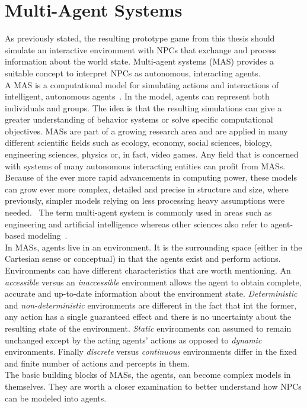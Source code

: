 \section{Multi-Agent Systems}
As previously stated, the resulting prototype game from this thesis should simulate an interactive environment with NPCs that exchange and process information about the world state. Multi-agent systems (MAS) provides a suitable concept to interpret NPCs as autonomous, interacting agents.\\
A MAS is a computational model for simulating actions and interactions of intelligent, autonomous agents~\cite{Wooldridge2009}. In the model, agents can represent both individuals and groups. The idea is that the resulting simulations can give a greater understanding of behavior systems or solve specific computational objectives. MASs are part of a growing research area and are applied in many different scientific fields such as ecology, economy, social sciences, biology, engineering sciences, physics or, in fact, video games. Any field that is concerned with systems of many autonomous interacting entities can profit from MASs. Because of the ever more rapid advancements in computing power, these models can grow ever more complex, detailed and precise in structure and size, where previously, simpler models relying on less processing heavy assumptions were needed.~\cite{Helbing2012} The term multi-agent system is commonly used in areas such as engineering  and artificial intelligence whereas other sciences also refer to agent-based modeling~\cite{Niazi2011}.\\
In MASs, agents live in an environment. It is the surrounding space (either in the Cartesian sense or conceptual) in that the agents exist and perform actions. Environments can have different characteristics that are worth mentioning. An \textit{accessible} versus an \textit{inaccessible} environment allows the agent to obtain complete, accurate and up-to-date information about the environment state. \textit{Deterministic} and \textit{non-deterministic} environments are different in the fact that int the former, any action has a single guaranteed effect and there is no uncertainty about the resulting state of the environment. \textit{Static} environments can assumed to remain unchanged except by the acting agents' actions as opposed to \textit{dynamic} environments. Finally \textit{discrete} versus \textit{continuous} environments differ in the fixed and finite number of actions and percepts in them.~\cite{Wooldridge2009}\\
The basic building blocks of MASs, the agents, can become complex models in themselves. They are worth a closer examination to better understand how NPCs can be modeled into agents.
